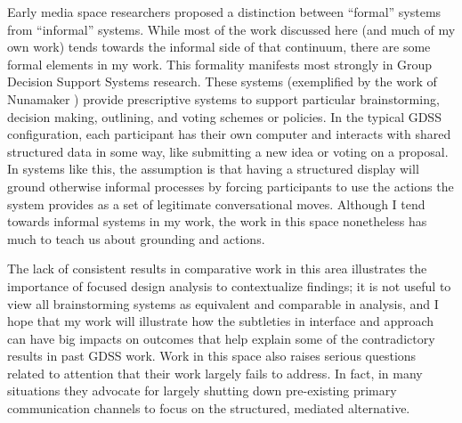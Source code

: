 \documentclass{tufte-handout}
\begin{document}
Early media space researchers proposed a distinction between ``formal'' systems from ``informal'' systems. \citep{Olson:1991vz} While most of the work discussed here (and much of my own work) tends towards the informal side of that continuum, there are some formal elements in my work. This formality manifests most strongly in Group Decision Support Systems research. These systems (exemplified by the work of Nunamaker \citep{nunamaker_electronic_1991}) provide prescriptive systems to support particular brainstorming, decision making, outlining, and voting schemes or policies. In the typical GDSS configuration, each participant has their own computer and interacts with shared structured data in some way, like submitting a new idea or voting on a proposal. In systems like this, the assumption is that having a structured display will ground otherwise informal processes by forcing participants to use the actions the system provides as a set of legitimate conversational moves. Although I tend towards informal systems in my work, the work in this space nonetheless has much to teach us about grounding and actions. 

The lack of consistent results in comparative work in this area \citep{Dennis:1988ww} illustrates the importance of focused design analysis to contextualize findings; it is not useful to view all brainstorming systems as equivalent and comparable in analysis, and I hope that my work will illustrate how the subtleties in interface and approach can have big impacts on outcomes that help explain some of the contradictory results in past GDSS work. Work in this space also raises serious questions related to attention that their work largely fails to address. In fact, in many situations they advocate for largely shutting down pre-existing primary communication channels to focus on the structured, mediated alternative.
\end{document}
